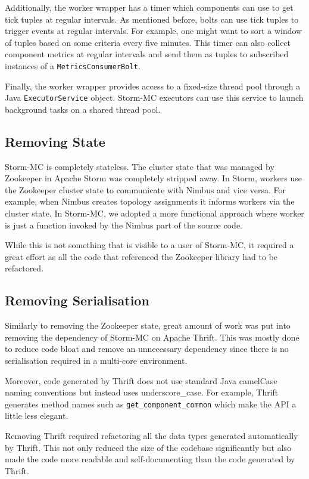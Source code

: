 Additionally, the worker wrapper has a timer which components can use to get tick tuples at regular intervals. As mentioned before, bolts can use tick tuples to trigger events at regular intervals. For example, one might want to sort a window of tuples based on some criteria every five minutes. This timer can also collect component metrics at regular intervals and send them as tuples to subscribed instances of a \texttt{MetricsConsumerBolt}.

Finally, the worker wrapper provides access to a fixed-size thread pool through a Java \texttt{ExecutorService} object. Storm-MC executors can use this service to launch background tasks on a shared thread pool.

\subsection{Removing State}

Storm-MC is completely stateless. The cluster state that was managed by Zookeeper in Apache Storm was completely stripped away. In Storm, workers use the Zookeeper cluster state to communicate with Nimbus and vice versa. For example, when Nimbus creates topology assignments it informs workers via the cluster state. In Storm-MC, we adopted a more functional approach where worker is just a function invoked by the Nimbus part of the source code.

While this is not something that is visible to a user of Storm-MC, it required a great effort as all the code that referenced the Zookeeper library had to be refactored.

\subsection{Removing Serialisation}

Similarly to removing the Zookeeper state, great amount of work was put into removing the dependency of Storm-MC on Apache Thrift. This was mostly done to reduce code bloat and remove an unnecessary dependency since there is no serialisation required in a multi-core environment.

Moreover, code generated by Thrift does not use standard Java camelCase naming conventions but instead uses underscore\_case. For example, Thrift generates method names such as \texttt{get\_component\_common} which make the API a little less elegant.

Removing Thrift required refactoring all the data types generated automatically by Thrift. This not only reduced the size of the codebase significantly but also made the code more readable and self-documenting than the code generated by Thrift.

